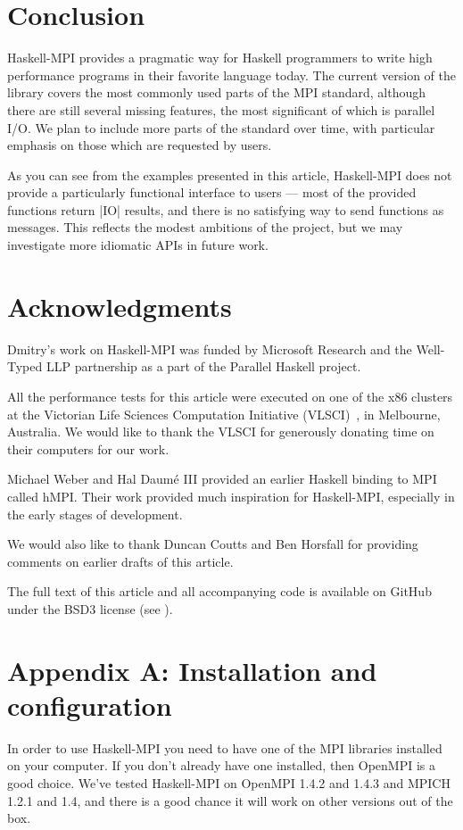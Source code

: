 \documentclass{tmr}
\begin{document}
\section{Conclusion}

Haskell-MPI provides a pragmatic way for Haskell programmers to write high performance programs in
their favorite language today. The current version of the library covers the most commonly used parts of
the MPI standard, although there are still several missing features, the most significant of which is
parallel I/O. We plan to include more parts of the standard over time, with particular emphasis on those
which are requested by users.

As you can see from the examples presented in this article, Haskell-MPI
does not provide a particularly functional interface to users --- most of the provided functions return
|IO| results, and there is no satisfying way to send functions as messages. This reflects the
modest ambitions of the project, but we may investigate more idiomatic APIs in future work.

\section{Acknowledgments}

Dmitry's work on Haskell-MPI was funded by Microsoft Research and the Well-Typed LLP partnership as a part of the Parallel Haskell project.

All the performance tests for this article were executed on one of the x86 clusters at the
Victorian Life Sciences Computation Initiative (VLSCI)~\cite{VLSCI}, in Melbourne, Australia.
We would like to thank the VLSCI for
generously donating time on their computers for our work.

Michael Weber and Hal Daum\'{e} III provided an earlier Haskell binding to MPI called hMPI. Their work
provided much inspiration for Haskell-MPI, especially in the early stages of development.

We would also like to thank Duncan Coutts and Ben Horsfall for providing comments on earlier drafts of this
article.

The full text of this article and all accompanying code is available on GitHub under the BSD3 license (see \cite{article}).

\section{Appendix A: Installation and configuration}
\label{appendix-A}
In order to use Haskell-MPI you need to have one of the
MPI libraries installed on your computer. If you don't already have one installed, then 
OpenMPI is a good choice. We've tested Haskell-MPI on
OpenMPI 1.4.2 and 1.4.3 and MPICH 1.2.1 and 1.4, and there is a good chance it
will work on other versions out of the box.
\end{document}
